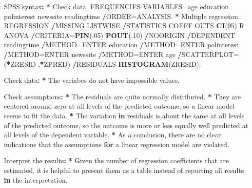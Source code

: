\documentclass[a4paper]{book}
\newenvironment{Shaded}{\begin{snugshade}}{\end{snugshade}}
\newcommand{\KeywordTok}[1]{\textcolor[rgb]{0,0,0}{\textbf{#1}}}
\newcommand{\DecValTok}[1]{\textcolor[rgb]{0.00,0.00,0.00}{#1}}
\newcommand{\StringTok}[1]{\textcolor[rgb]{0.00,0.00,0.00}{#1}}
\newcommand{\ControlFlowTok}[1]{\textcolor[rgb]{0.00,0.00,0.00}{\textbf{#1}}}
\newcommand{\OperatorTok}[1]{\textcolor[rgb]{0.00,0.00,0.00}{\textbf{#1}}}
\newcommand{\ErrorTok}[1]{\textcolor[rgb]{0.00,0.00,0.00}{\textbf{#1}}}
\newcommand{\NormalTok}[1]{#1}
\theoremstyle{definition}
\theoremstyle{definition}
\theoremstyle{definition}
\theoremstyle{remark}
\begin{document}
\begin{Shaded}
\begin{Highlighting}[]
\NormalTok{SPSS syntax}\OperatorTok{:}\StringTok{  }
\StringTok{  }
\ErrorTok{*}\StringTok{ }\NormalTok{Check data.    }
\NormalTok{FREQUENCIES VARIABLES=age education polinterest newssite readingtime    }
  \OperatorTok{/}\NormalTok{ORDER=ANALYSIS.    }
\OperatorTok{*}\StringTok{ }\NormalTok{Multiple regression.    }
\NormalTok{REGRESSION    }
  \OperatorTok{/}\NormalTok{MISSING LISTWISE    }
  \OperatorTok{/}\NormalTok{STATISTICS COEFF OUTS }\KeywordTok{CI}\NormalTok{(}\DecValTok{95}\NormalTok{) R ANOVA    }
  \OperatorTok{/}\NormalTok{CRITERIA=}\KeywordTok{PIN}\NormalTok{(.}\DecValTok{05}\NormalTok{) }\KeywordTok{POUT}\NormalTok{(.}\DecValTok{10}\NormalTok{)    }
  \OperatorTok{/}\NormalTok{NOORIGIN     }
  \OperatorTok{/}\NormalTok{DEPENDENT readingtime    }
  \OperatorTok{/}\NormalTok{METHOD=ENTER education    }
  \OperatorTok{/}\NormalTok{METHOD=ENTER polinterest    }
  \OperatorTok{/}\NormalTok{METHOD=ENTER newssite    }
  \OperatorTok{/}\NormalTok{METHOD=ENTER age    }
  \OperatorTok{/}\NormalTok{SCATTERPLOT=(}\OperatorTok{*}\NormalTok{ZRESID ,}\OperatorTok{*}\NormalTok{ZPRED)    }
  \OperatorTok{/}\NormalTok{RESIDUALS }\KeywordTok{HISTOGRAM}\NormalTok{(ZRESID).    }
  
\NormalTok{Check data}\OperatorTok{:}\StringTok{  }
\StringTok{  }
\ErrorTok{*}\StringTok{ }\NormalTok{The variabes do not have impossible values.  }
  
\NormalTok{Check assumptions}\OperatorTok{:}\StringTok{  }
\StringTok{  }
\ErrorTok{*}\StringTok{ }\NormalTok{The residuals are quite normally distributed.  }
\OperatorTok{*}\StringTok{ }\NormalTok{They are centered around zero at all levels of the predicted outcome, so a}
\NormalTok{linear model seems to fit the data.}
\OperatorTok{*}\StringTok{ }\NormalTok{The variation }\ControlFlowTok{in}\NormalTok{ residuals is about the same at all levels of the predicted}
\NormalTok{outcome, so the outcome is more or less equally well predicted at all levels}
\NormalTok{of the dependent variable.}
\OperatorTok{*}\StringTok{ }\NormalTok{As a conclusion, there are no clear indications that the assumptions }\ControlFlowTok{for}\NormalTok{ a}
\NormalTok{linear regression model are violated.}
  
\NormalTok{Interpret the results}\OperatorTok{:}\StringTok{  }
\StringTok{  }
\ErrorTok{*}\StringTok{ }\NormalTok{Given the number of regression coefficients that are estimated, it is}
\NormalTok{helpful to present them as a table instead of reporting all results }\ControlFlowTok{in}\NormalTok{ the}
\NormalTok{interpretation.}
  

\end{Highlighting}
\end{Shaded}
\end{document}
